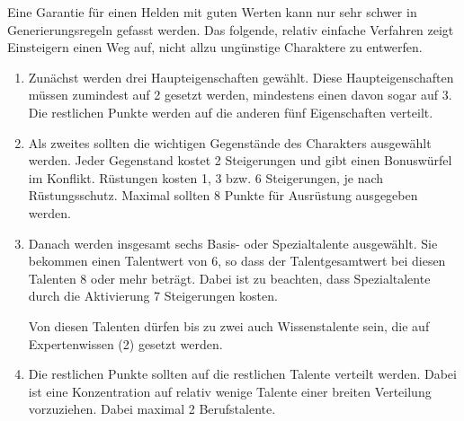 Eine Garantie für einen Helden mit guten Werten kann nur sehr schwer in Generierungsregeln gefasst werden. Das folgende, relativ einfache Verfahren zeigt Einsteigern einen Weg auf, nicht allzu ungünstige Charaktere zu entwerfen.
\begin{enumerate}
  \item Zunächst werden drei Haupteigenschaften gewählt. Diese Haupteigenschaften müssen zumindest auf 2 gesetzt werden, mindestens einen davon sogar auf 3. Die restlichen Punkte werden auf die anderen fünf Eigenschaften verteilt.
  
  \item Als zweites sollten die wichtigen Gegenstände des Charakters ausgewählt werden. Jeder Gegenstand kostet 2 Steigerungen und gibt einen Bonuswürfel im Konflikt. Rüstungen kosten 1, 3 bzw. 6 Steigerungen, je nach Rüstungsschutz. Maximal sollten 8 Punkte für Ausrüstung ausgegeben werden.

  \item Danach werden insgesamt sechs Basis- oder Spezialtalente ausgewählt. Sie bekommen einen Talentwert von 6, so dass der Talentgesamtwert bei diesen Talenten 8 oder mehr beträgt. Dabei ist zu beachten, dass Spezialtalente durch die Aktivierung 7 Steigerungen kosten.
  
  Von diesen Talenten dürfen bis zu zwei auch Wissenstalente sein, die auf Expertenwissen (2) gesetzt werden.

  \item Die restlichen Punkte sollten auf die restlichen Talente verteilt werden. Dabei ist eine Konzentration auf relativ wenige Talente einer breiten Verteilung vorzuziehen. Dabei maximal 2 Berufstalente.
\end{enumerate}


